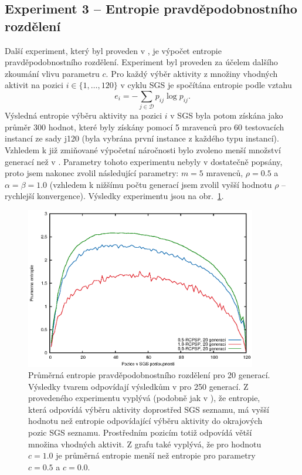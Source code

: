 \documentclass[a4paper,12pt]{article}
\begin{document}
\clearpage
\subsection{Experiment 3 -- Entropie pravděpodobnostního rozdělení}
Další experiment, který byl proveden v \cite{Merkle00antcolony, 1027745}, je výpočet entropie pravděpodobnostního rozdělení.
Experiment byl proveden za účelem dalšího zkoumání vlivu parametru $c$.
Pro každý výběr aktivity z množiny vhodných aktivit na pozici $i \in \{1,\dots, 120\}$ v cyklu SGS je
spočítána entropie podle vztahu
$$
  e_i = -\sum_{j \in\mathcal{D}}p_{ij}\log p_{ij}.
$$
Výsledná entropie výběru aktivity na pozici $i$ v SGS byla potom získána jako průměr 300
hodnot, které byly získány pomocí 5 mravenců pro 60 testovacích instancí ze sady j120 (byla vybrána první 
instance z každého typu instancí). Vzhledem k již zmiňované výpočetní náročnosti bylo zvoleno menší
množství generací než v \cite{Merkle00antcolony, 1027745}. Parametry tohoto experimentu nebyly v 
\cite{Merkle00antcolony, 1027745} dostatečně popsány, proto jsem
  nakonec zvolil následující parametry: $m= 5$ mravenců, $\rho = 0.5$ a $\alpha = \beta = 1.0$ (vzhledem k nižšímu počtu generací
  jsem zvolil vyšší hodnotu $\rho$ -- rychlejší konvergence). Výsledky experimentu jsou na obr.~\ref{img:ent}.

\begin{figure}[!ht]
  \centering
  \includegraphics[width=0.9\textwidth]{img/ent.eps}
  \caption{Průměrná entropie pravděpodobnostního rozdělení pro 20 generací. Výsledky tvarem odpovídají výsledkům
  v \cite{Merkle00antcolony, 1027745} pro 250 generací.  Z provedeného experimentu vyplývá (podobně jak v \cite{Merkle00antcolony, 1027745}), 
  že entropie, která odpovídá výběru aktivity doprostřed SGS seznamu, má vyšší hodnotu než entropie odpovídající výběru aktivity do
  okrajových pozic SGS seznamu. Prostředním pozicím totiž odpovídá větší množina vhodných aktivit. Z grafu také vyplývá, že pro 
  hodnotu $c = 1.0$ je průměrná entropie menší než entropie pro parametry $c = 0.5$ a $c = 0.0$.}
  \label{img:ent}
\end{figure}
\end{document}
